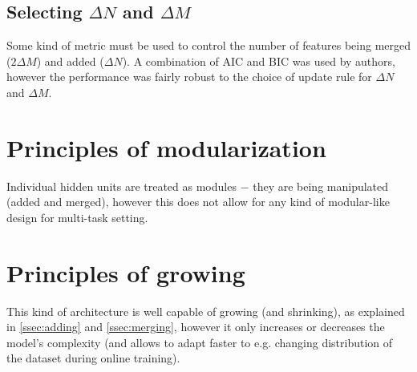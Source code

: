 \documentclass[a4paper,twocolumn]{article}
\begin{document}
\subsection{Selecting $\Delta N$ and $\Delta M$}
Some kind of metric must be used to control the number of features being merged ($2\Delta M$) and added ($\Delta N$). A combination of AIC and BIC was used by authors, however the performance was fairly robust to the choice of update rule for $\Delta N$ and $\Delta M$.

\section{Principles of modularization}
Individual hidden units are treated as modules $-$ they are being manipulated (added and merged), however this does not allow for any kind of modular-like design for multi-task setting.

\section{Principles of growing}
This kind of architecture is well capable of growing (and shrinking), as explained in \ref{ssec:adding} and \ref{ssec:merging}, however it only increases or decreases the model's complexity (and allows to adapt faster to e.g. changing distribution of the dataset during online training).
\end{document}
